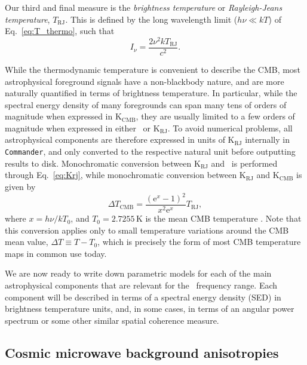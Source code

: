 \documentclass[twocolumn]{aa}
\def\commander{\texttt{Commander}}
\newcommand{\e}{\mathrm e}
\begin{document}
Our third and final measure is the \emph{brightness temperature} or
\emph{Rayleigh-Jeans temperature}, $T_{\mathrm{RJ}}$. This is defined
by the long wavelength limit ($h\nu \ll kT$) of
Eq.~\eqref{eq:T_thermo}, such that
\begin{equation}
  I_{\nu} = \frac{2\nu^2kT_{\mathrm{RJ}}}{c^2}.
  \label{eq:Krj}
\end{equation}

While the thermodynamic temperature is convenient to describe the CMB,
most astrophysical foreground signals have a non-blackbody nature, and
are more naturally quantified in terms of brightness temperature. In
particular, while the spectral energy density of many foregrounds can
span many tens of orders of magnitude when expressed in
$\mathrm{K_{CMB}}$, they are usually limited to a few orders of
magnitude when expressed in either \MJysr\ or
$\textrm{K}_{\mathrm{RJ}}$. To avoid numerical problems, all
astrophysical components are therefore expressed in units of
$\textrm{K}_{\mathrm{RJ}}$ internally in \commander, and only
converted to the respective natural unit before outputting results to
disk. Monochromatic conversion between $\mathrm{K}_{\mathrm{RJ}}$ and
\MJysr\ is performed through Eq.~\eqref{eq:Krj}, while monochromatic
conversion between $\mathrm{K}_{\mathrm{RJ}}$ and
$\mathrm{K}_{\mathrm{CMB}}$ is given by
\begin{equation}
  \Delta T_{\mathrm{CMB}} = \frac{\left(\e^{x}-1\right)^2}{x^2\e^{x}}
  T_{\mathrm{RJ}},
  \label{eq:rj2cmb}
\end{equation}
where $x=h\nu/kT_{0}$, and $T_0 = 2.7255\,\mathrm{K}$ is the mean CMB
temperature \citep{fixsen2009}. Note that this conversion applies only
to small temperature variations around the CMB mean value, $\Delta T
\equiv T - T_0$, which is precisely the form of most CMB temperature
maps in common use today.

We are now ready to write down parametric models for each of the main
astrophysical components that are relevant for the \Planck\ frequency
range. Each component will be described in terms of a spectral energy
density (SED) in brightness temperature units, and, in some cases, in terms of an
angular power spectrum or some other similar spatial coherence
measure.

\subsection{Cosmic microwave background anisotropies}
\label{sec:cmb}
\end{document}
